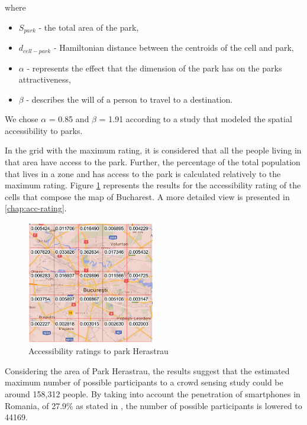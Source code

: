 where

\begin{itemize}
\item \( S_{park} \) - the total area of the park,
\item \(d_{cell-park}\) - Hamiltonian distance between the centroids of the cell and park,
\item \(\alpha\) - represents the effect that the dimension of the park has on the parks attractiveness,
\item \(\beta\) - describes the will of a person to travel to a destination.
\end{itemize}

We chose \(\alpha\) = 0.85 and \(\beta\) = 1.91 according to a study \cite{zhang2011modeling} that modeled the spatial accessibility to parks.

In the grid with the maximum rating, it is considered that all the people living in that area have access to the park. Further, the percentage of the total population that lives in a zone and has access to the park is calculated relatively to the maximum rating. Figure \ref{fig:access} represents the results for the accessibility rating of the cells that compose the map of Bucharest. A more detailed view is presented in \ref{chap:acc-rating}.

\begin{figure}
    \centering
    \includegraphics[width=0.5\textwidth]{src/img/Bucharest-Rating.png}
    \caption{Accessibility ratings to park Herastrau}
    \label{fig:access}
\end{figure}

Considering the area of Park Herastrau, the results suggest that the estimated maximum number of possible participants to a crowd sensing study could be around 158,312 people. By taking into account the penetration of smartphones in Romania, of 27.9\% as stated in \cite{poushter2016smartphone}, the number of possible participants is lowered to 44169.

